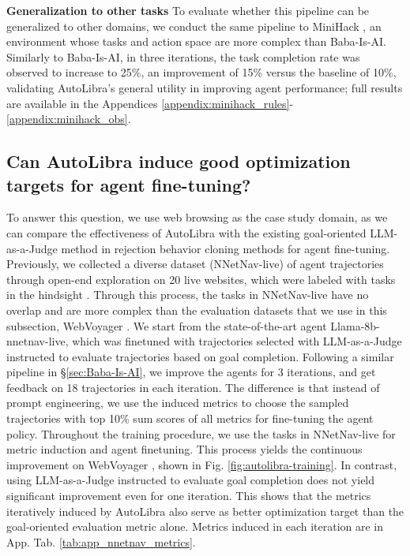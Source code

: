 \textbf{Generalization to other tasks} To evaluate whether this pipeline can be generalized to other domains, we conduct the same pipeline to MiniHack \citep{samvelyan2021minihackplanetsandboxopenended}, an environment whose tasks and action space are more complex than Baba-Is-AI. Similarly to Baba-Is-AI, in three iterations, the task completion rate was observed to increase to 25\%, an improvement of 15\% versus the baseline of 10\%, validating AutoLibra's general utility in improving agent performance; full results are available in the Appendices \ref{appendix:minihack_rules}-\ref{appendix:minihack_obs}.


\subsection{Can AutoLibra induce good optimization targets for agent fine-tuning?}
\label{sec:webvoyager}
To answer this question, we use web browsing as the case study domain, as we can compare the effectiveness of AutoLibra with the existing goal-oriented LLM-as-a-Judge method in rejection behavior cloning methods for agent fine-tuning.
Previously, we collected a diverse dataset (NNetNav-live) of agent trajectories through open-end exploration on 20 live websites, which were labeled with tasks in the hindsight \citep{Murty2025NNetNav}. 
Through this process, the tasks in NNetNav-live have no overlap and are more complex than the evaluation datasets that we use in this subsection, WebVoyager \citep{he2024webvoyager}.
We start from the state-of-the-art agent Llama-8b-nnetnav-live, which was finetuned with trajectories selected with LLM-as-a-Judge instructed to evaluate trajectories based on goal completion. Following a similar pipeline in \S\ref{sec:Baba-Is-AI}, we improve the agents for 3 iterations, and get feedback on 18 trajectories in each iteration. The difference is that instead of prompt engineering, we use the induced metrics to choose the sampled trajectories with top 10\% sum scores of all metrics for fine-tuning the agent policy. Throughout the training procedure, we use the tasks in NNetNav-live \citep{Murty2025NNetNav} for metric induction and agent finetuning. This process yields the continuous improvement on WebVoyager \citep{he2024webvoyager}, shown in Fig. \ref{fig:autolibra-training}. In contrast, using LLM-as-a-Judge instructed to evaluate goal completion does not yield significant improvement even for one iteration. This shows that the metrics iteratively induced by AutoLibra also serve as better optimization target than the goal-oriented evaluation metric alone. Metrics induced in each iteration are in App. Tab. \ref{tab:app_nnetnav_metrics}.